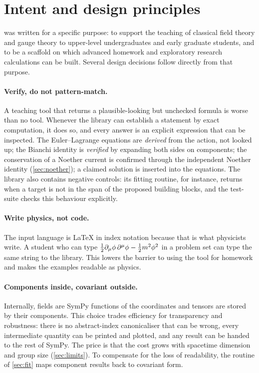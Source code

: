 \section{Intent and design principles}
\label{sec:intent}

\fs{} was written for a specific purpose: to support the teaching of classical field theory and gauge theory to upper-level undergraduates and early graduate students, and to be a scaffold on which advanced homework and exploratory research calculations can be built. Several design decisions follow directly from that purpose.

\paragraph{Verify, do not pattern-match.}
A teaching tool that returns a plausible-looking but unchecked formula is worse than no tool. Whenever the library can establish a statement by exact computation, it does so, and every answer is an explicit expression that can be inspected. The Euler--Lagrange equations are \emph{derived} from the action, not looked up; the Bianchi identity is \emph{verified} by expanding both sides on components; the conservation of a Noether current is confirmed through the independent Noether identity (\cref{sec:noether}); a claimed solution is inserted into the equations. The library also contains negative controls: its fitting routine, for instance, returns  when a target is not in the span of the proposed building blocks, and the test-suite checks this behaviour explicitly.

\paragraph{Write physics, not code.}
The input language is \LaTeX{} in index notation because that is what physicists write. A student who can type $\frac12\partial_\mu\phi\,\partial^\mu\phi-\frac12m^2\phi^2$ in a problem set can type the same string to the library. This lowers the barrier to using the tool for homework and makes the examples readable as physics.

\paragraph{Components inside, covariant outside.}
Internally, fields are SymPy functions of the coordinates and tensors are stored by their components. This choice trades efficiency for transparency and robustness: there is no abstract-index canonicaliser that can be wrong, every intermediate quantity can be printed and plotted, and any result can be handed to the rest of SymPy. The price is that the cost grows with spacetime dimension and group size (\cref{sec:limits}). To compensate for the loss of readability, the  routine of \cref{sec:fit} maps component results back to covariant form.

